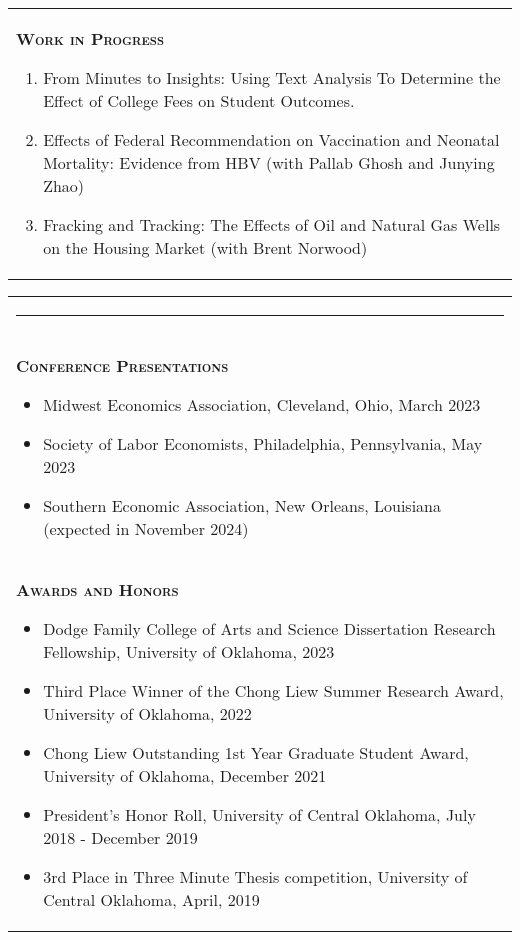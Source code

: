 \documentclass[10pt,letterpaper]{article}
\begin{document}
\begin{tabular}{p{7.5in}}
{\textsc{\textbf{Work in Progress}}}
\begin{enumerate}

\item From Minutes to Insights: Using Text Analysis To Determine the Effect of College Fees on Student Outcomes. 

\item Effects of Federal Recommendation on Vaccination and Neonatal Mortality: Evidence from HBV (with Pallab Ghosh and Junying Zhao)

\item Fracking and Tracking: The Effects of Oil and Natural Gas Wells on the Housing Market (with Brent Norwood)
\end{enumerate}


\end{tabular}



\begin{tabular}{p{7.5in}}
\multicolumn{3}{p{7.5in}}{\hrule}\\[1ex]

	{\large \textsc{\textbf{\large{Conference Presentations}}}}
	\begin{itemize}
    \item Midwest Economics Association,  Cleveland,  Ohio,  March 2023
    \item Society of Labor Economists,  Philadelphia,  Pennsylvania,  May 2023
    \item Southern Economic Association,  New Orleans,  Louisiana (expected in November 2024)
	\end{itemize}
	\\
	
	{\large \textsc{\textbf{\large{Awards and Honors}}}}
	\begin{itemize}
 \item Dodge Family College of Arts and Science Dissertation Research Fellowship, University of Oklahoma,  2023
	\item Third Place Winner of the Chong Liew Summer Research Award, University of Oklahoma, 2022
    \item Chong Liew Outstanding 1st Year Graduate Student Award, University of Oklahoma, December 2021
    \item President's Honor Roll, University of Central Oklahoma, July 2018 - December 2019
    \item 3rd Place in Three Minute Thesis competition, University of Central Oklahoma, April, 2019
	\end{itemize}

\multicolumn{3}{p{7.5in}}{\hrule}\\[.5ex]
\end{tabular}
\end{document}
